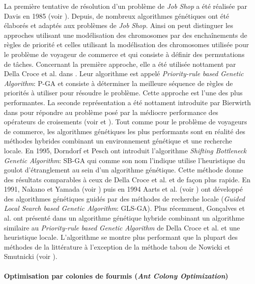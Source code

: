 La première tentative de résolution d'un problème de \textit{Job Shop} a été réalisée par Davis en 1985 (voir \cite{Davis1985}). Depuis, de nombreux algorithmes génétiques ont été élaborés et adaptés aux problèmes de \textit{Job Shop}. Ainsi on peut distinguer les approches utilisant une modélisation des chromosomes par des enchaînements de règles de priorité et celles utilisant la modélisation des chromosomes utilisée pour le problème de voyageur de commerce et qui consiste à définir des permutations de tâches. Concernant la première approche, elle a été utilisée nottament par Della Croce et al. dans \cite{DellaCroce1995}. Leur algorithme est appelé \textit{Priority-rule based Genetic Algorithm}: P-GA et consiste à déterminer la meilleure séquence de règles de priorités à utiliser pour résoudre le problème. Cette approche est l'une des plus performantes. La seconde représentation a été nottament introduite par Bierwirth dans \cite{Bierwirth1995} pour répondre au problème posé par la médiocre performance des 
opérateurs de croisements (voir \cite{Dorndorf1995} et \cite{Bierwirth1995}). 
Tout comme pour le problème de voyageurs de commerce, les algorithmes génétiques les plus performants sont en réalité des méthodes hybrides combinant un environnement génétique et une recherche locale. En 1995, Dorndorf et Pesch ont introduit l'algorithme \textit{Shifting Bottleneck Genetic Algorithm}: SB-GA qui comme son nom l'indique utilise l'heuristique du goulot d'étranglement au sein d'un algorithme génétique. Cette méthode donne des résultats comparables à ceux de Della Croce et al. et de façon plus rapide. En 1991, Nakano et Yamada (voir \cite{Nakano1991}) puis en 1994 Aarts et al. (voir \cite{Aarts1994}) ont développé des algorithmes génétiques guidés par des méthodes de recherche locale (\textit{Guided Local Search based Genetic Algorithm}: GLS-GA).
Plus récemment, Gonçalves et al. ont présenté dans \cite{Goncalves2005} un algorithme génétique hybride combinant un algorithme similaire au \textit{Priority-rule based Genetic Algorithm} de Della Croce et al. et une heuristique locale. L'algorithme se montre plus performant que la plupart des méthodes de la littérature à l'exception de la méthode tabou de Nowicki et Smutnicki (voir \cite{Nowicki1996}).

\paragraph{Optimisation par colonies de fourmis (\textit{Ant Colony Optimization})}

